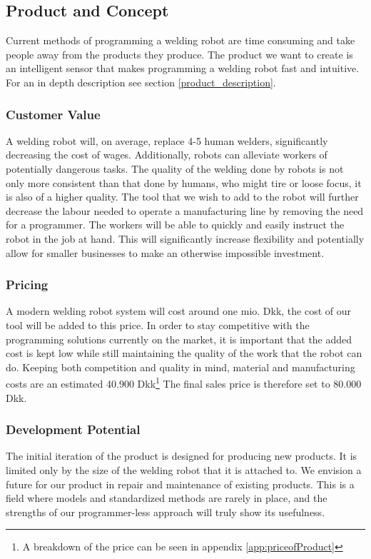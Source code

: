 \subsection{Product and Concept}
Current methods of programming a welding robot are time consuming and take people away from the products they produce.
The product we want to create is an intelligent sensor that makes programming a welding robot fast and intuitive. 
For an in depth description see section \ref{product_description}.
\subsubsection{Customer Value}
A welding robot will, on average, replace 4-5 human welders, significantly decreasing the cost of wages. Additionally, robots can alleviate workers of potentially dangerous tasks. The quality of the welding done by robots is not only more consistent than that done by humans, who might tire or loose focus, it is also of a higher quality. The tool that we wish to add to the robot will further decrease the labour needed to operate a manufacturing line by removing the need for a programmer. The workers will be able to quickly and easily instruct the robot in the job at hand. This will significantly increase flexibility and potentially allow for smaller businesses to make an otherwise impossible investment.

\subsubsection{Pricing}
A modern welding robot system will cost around one mio. Dkk, the cost of our tool will be added to this price. In order to stay competitive with the programming solutions currently on the market, it is important that the added cost is kept low while still maintaining the quality of the work that the robot can do. Keeping both competition and quality in mind, material and manufacturing costs are an estimated 40.900 Dkk\footnote{A breakdown of the price can be seen in appendix \ref{app:priceofProduct}} 
The final sales price is therefore set to 80.000 Dkk.

\subsubsection{Development Potential}
The initial iteration of the product is designed for producing new products. It is limited only by the size of the welding robot that it is attached to. We envision a future for our product in repair and maintenance of existing products. This is a field where models and standardized methods are rarely in place, and the strengths of our programmer-less approach will truly show its usefulness.

